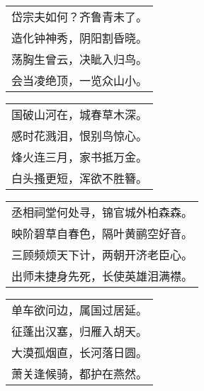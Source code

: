 \noindent\begin{minipage}{\linewidth}
  \vskip-3pt\begin{table}[H]
    \centering
    \begin{tabular}{@{}l@{}}
岱宗夫如何？齐鲁青未了。\\
造化钟神秀，阴阳割昏晓。\\
荡胸生曾云，决眦入归鸟。\\
会当凌绝顶，一览众山小。
    \end{tabular}
  \end{table}
\end{minipage}
\vspace{1cm}


\noindent\begin{minipage}{\linewidth}
  \vskip-3pt\begin{table}[H]
    \centering
    \begin{tabular}{@{}l@{}}
国破山河在，城春草木深。\\
感时花溅泪，恨别鸟惊心。\\
烽火连三月，家书抵万金。\\
白头搔更短，浑欲不胜簪。
    \end{tabular}
  \end{table}
\end{minipage}
\vspace{1cm}


\noindent\begin{minipage}{\linewidth}
  \vskip-3pt\begin{table}[H]
    \centering
    \begin{tabular}{@{}l@{}}
丞相祠堂何处寻，锦官城外柏森森。\\
映阶碧草自春色，隔叶黄鹂空好音。\\
三顾频烦天下计，两朝开济老臣心。\\
出师未捷身先死，长使英雄泪满襟。
    \end{tabular}
  \end{table}
\end{minipage}
\vspace{1cm}


\noindent\begin{minipage}{\linewidth}
  \vskip-3pt\begin{table}[H]
    \centering
    \begin{tabular}{@{}l@{}}
单车欲问边，属国过居延。\\
征蓬出汉塞，归雁入胡天。\\
大漠孤烟直，长河落日圆。\\
萧关逢候骑，都护在燕然。
    \end{tabular}
  \end{table}
\end{minipage}
\vspace{1cm}


